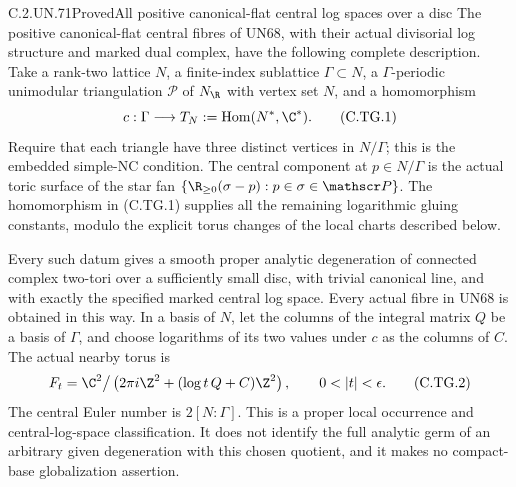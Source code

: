 \begin{statement}{C.2.UN.71}{Proved}{All positive canonical-flat central log spaces over a disc}
The positive canonical-flat central fibres of UN68,
with their actual divisorial log structure and marked
dual complex, have the following complete description.
Take a rank-two lattice $N$, a finite-index sublattice
$\Gamma\subset N$, a $\Gamma$-periodic unimodular
triangulation $\mathscr P$ of $N_{\R}$ with vertex set
$N$, and a homomorphism
\[
       c:\Gamma\longrightarrow T_N
          :=\operatorname{Hom}(N^*,\C^*).
\tag{C.TG.1}
\]
Require that each triangle have three distinct vertices
in $N/\Gamma$; this is the embedded simple-NC condition.
The central component at $p\in N/\Gamma$ is the actual
toric surface of the star fan
$\{\R_{\ge0}(\sigma-p):p\in\sigma\in\mathscr P\}$.
The homomorphism in (C.TG.1) supplies all the remaining
logarithmic gluing constants, modulo the explicit torus
changes of the local charts described below.

Every such datum gives a smooth proper analytic
degeneration of connected complex two-tori over a
sufficiently small disc, with trivial canonical line,
and with exactly the specified marked central log space.
Every actual fibre in UN68 is obtained in this way.
In a basis of $N$, let the columns of the integral
matrix $Q$ be a basis of $\Gamma$, and choose logarithms
of its two values under $c$ as the columns of $C$.
The actual nearby torus is
\[
 F_t=\C^2\big/
       \left(2\pi i\Z^2+(\log t\,Q+C)\Z^2\right),
       \qquad 0<|t|<\epsilon .
\tag{C.TG.2}
\]
The central Euler number is $2[N:\Gamma]$.
This is a proper local occurrence and central-log-space
classification. It does not identify the full analytic
germ of an arbitrary given degeneration with this
chosen quotient, and it makes no compact-base
globalization assertion.
\end{statement}

